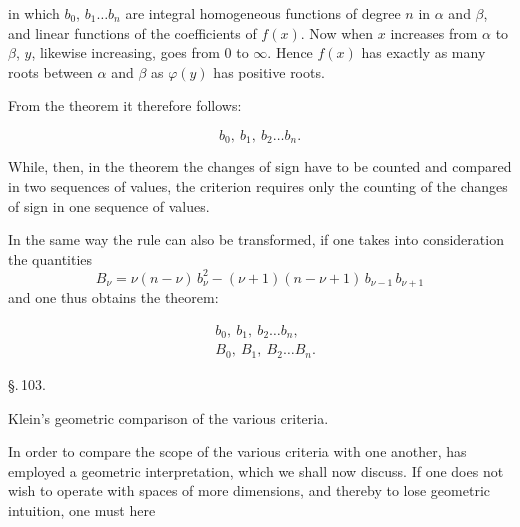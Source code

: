 in which $b_0$, $b_1 \ldots b_n$ are integral homogeneous functions of degree $n$ in $\alpha$ and $\beta$, and linear functions of the coefficients of $f(x)$. Now when $x$ increases from $\alpha$ to $\beta$, $y$, likewise increasing, goes from $0$ to $\infty$. Hence $f(x)$ has exactly as many roots between $\alpha$ and $\beta$ as $\varphi(y)$ has positive roots.

From the  theorem it therefore follows:

\[
b_0,\ b_1,\ b_2 \ldots b_n.
\]

While, then, in the  theorem the changes of sign have to be counted and compared in two sequences of values, the  criterion requires only the counting of the changes of sign in one sequence of values.

In the same way the  rule can also be transformed, if one takes into consideration the quantities
\[
B_\nu = \nu(n-\nu)\,b_\nu^2 - (\nu+1)(n-\nu+1)\,b_{\nu-1}\,b_{\nu+1}
\]
and one thus obtains the theorem:

\[
\begin{aligned}
&b_0,\ b_1,\ b_2 \ldots b_n,\\
&B_0,\ B_1,\ B_2 \ldots B_n.
\end{aligned}
\]

\begin{center}
\S.\,103.

Klein's geometric comparison of the various criteria.
\end{center}

In order to compare the scope of the various criteria with one another,  has employed a geometric interpretation, which we shall now discuss. If one does not wish to operate with spaces of more dimensions, and thereby to lose geometric intuition, one must here
